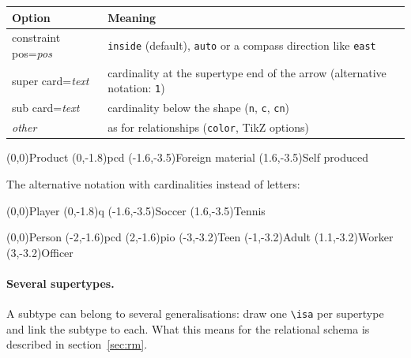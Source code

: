 \documentclass[10pt,a4paper]{article}
\newcommand\cs[1]{\texttt{\textbackslash#1}}
\newcommand\meta[1]{\textlangle\textit{#1}\textrangle}
\begin{document}
\begin{longtable}{@{}>{\ttfamily}p{3.6cm}p{12.2cm}@{}}
\toprule
\normalfont\textbf{Option} & \textbf{Meaning}\\\midrule
constraint pos=\meta{pos} & \texttt{inside} (default), \texttt{auto}
  or a compass direction like \texttt{east}\\
super card=\meta{text} & cardinality at the supertype end of the arrow
  (alternative notation: \texttt{1})\\
sub card=\meta{text} & cardinality below the shape (\texttt{n},
  \texttt{c}, \texttt{cn})\\
\meta{other} & as for relationships (\texttt{color}, TikZ options)\\
\bottomrule
\end{longtable}

\begin{example}
\begin{erdiagram}
  (0,0){Product}
  (0,-1.8){p}{cd}
  (-1.6,-3.5){Foreign material}
  (1.6,-3.5){Self produced}
\end{erdiagram}
\end{example}

The alternative notation with cardinalities instead of letters:

\begin{example}
\begin{erdiagram}
  (0,0){Player}
  (0,-1.8){q}
  (-1.6,-3.5){Soccer}
  (1.6,-3.5){Tennis}
\end{erdiagram}
\end{example}

\begin{example}
\begin{erdiagram}
  (0,0){Person}
  (-2,-1.6){p}{cd}
  (2,-1.6){p}{io}
  (-3,-3.2){Teen}
  (-1,-3.2){Adult}
  (1.1,-3.2){Worker}
  (3,-3.2){Officer}
\end{erdiagram}
\end{example}

\paragraph{Several supertypes.} A subtype can belong to several generalisations: draw one
\cs{isa} per supertype and link the subtype to each. What this means for the relational schema
is described in section~\ref{sec:rm}.
\end{document}
